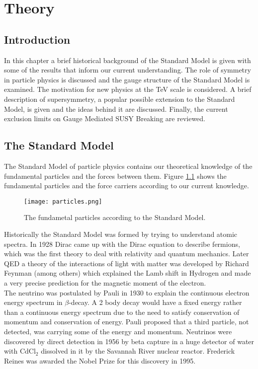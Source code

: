 \chapter{Theory}

\section{Introduction}

In this chapter a brief historical background of the Standard Model is given
with some of the results that inform our current understanding. The role of
symmetry in particle physics is discussed and the gauge structure of the
Standard Model is examined. The motivation for new physics at the TeV scale is
considered. A brief description of supersymmetry, a popular possible extension 
to the Standard Model, is given and the ideas behind it are discussed. Finally,
the current exclusion limits on Gauge Mediated SUSY Breaking are reviewed. 

\section{The Standard Model}

The Standard Model of particle physics contains our theoretical knowledge of the
fundamental particles and the forces between them. Figure \ref{fig:particles}
shows the fundamental particles and the force carriers according to our current
knowledge. \\

\begin{figure}
\begin{center}
\texttt{[image: particles.png]}
\end{center}
\caption{The fundametal particles according to the Standard Model.}
\label{fig:particles}
\end{figure}

Historically the Standard Model was formed by trying to understand atomic
spectra. In 1928 Dirac came up with the Dirac equation to describe fermions, 
which was the first theory to deal with relativity and quantum mechanics. Later 
QED a theory of the interactions of light with matter was developed by Richard 
Feynman (among others) which explained the Lamb shift in Hydrogen and made a 
very precise prediction for the magnetic moment of the electron. \\

The neutrino was postulated by Pauli in 1930 to explain the continuous electron 
energy spectrum in $\beta$-decay. A 2 body decay would have a fixed energy
rather than a continuous energy spectrum due to the need to satisfy conservation
of momentum and conservation of energy. Pauli proposed that a third particle,
not detected, was carrying some of the energy and momentum. Neutrinos were 
discovered by direct detection in 1956 by beta capture in a huge detector of
water with CdCl$_{2}$ dissolved in it by the Savannah River nuclear reactor. 
Frederick Reines was awarded the Nobel Prize for this discovery in 1995. \\


